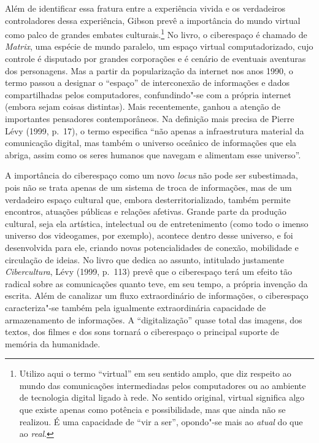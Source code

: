 Além de identificar essa fratura entre a experiência vivida e os
verdadeiros controladores dessa experiência, Gibson prevê a importância
do mundo virtual como palco de grandes embates culturais.\footnote{Utilizo aqui o termo ``virtual'' em seu sentido amplo, que diz respeito ao mundo das comunicações intermediadas pelos computadores ou ao ambiente de tecnologia digital ligado à rede. No sentido original, virtual significa algo que existe apenas como potência e possibilidade, mas que ainda não se realizou. É uma capacidade de ``vir a ser'', opondo"-se mais ao \emph{atual} do que ao \emph{real}.} No livro, o
ciberespaço é chamado de \emph{Matrix}, uma espécie de mundo paralelo,
um espaço virtual computadorizado, cujo controle é disputado por grandes
corporações e é cenário de eventuais aventuras dos personagens. Mas a
partir da popularização da internet nos anos 1990, o termo passou a
designar o ``espaço'' de interconexão de informações e dados
compartilhadas pelos computadores, confundindo"-se com a própria internet
(embora sejam coisas distintas). Mais recentemente, ganhou a atenção de
importantes pensadores contemporâneos. Na definição mais precisa de
Pierre Lévy (1999, p.~17), o termo especifica ``não apenas a
infraestrutura material da comunicação digital, mas também o universo
oceânico de informações que ela abriga, assim como os seres humanos que
navegam e alimentam esse universo''.

A importância do ciberespaço como um novo \emph{locus} não pode ser
subestimada, pois não se trata apenas de um sistema de troca de
informações, mas de um verdadeiro espaço cultural que, embora desterritorializado,
também permite encontros, atuações públicas e relações afetivas.
Grande parte da produção cultural, seja ela artística,
intelectual ou de entretenimento (como todo o imenso universo dos
videogames, por exemplo), acontece dentro desse universo, e foi
desenvolvida para ele, criando novas potencialidades de conexão,
mobilidade e circulação de ideias. No livro que dedica ao assunto,
intitulado justamente \emph{Cibercultura}, Lévy (1999, p.~113) prevê que
o ciberespaço terá um efeito tão radical sobre as comunicações quanto
teve, em seu tempo, a própria invenção da escrita. Além de canalizar um
fluxo extraordinário de informações, o ciberespaço caracteriza"-se também
pela igualmente extraordinária capacidade de armazenamento de
informações. A ``digitalização'' quase total das imagens, dos textos,
dos filmes e dos sons tornará o ciberespaço o principal suporte de
memória da humanidade.


